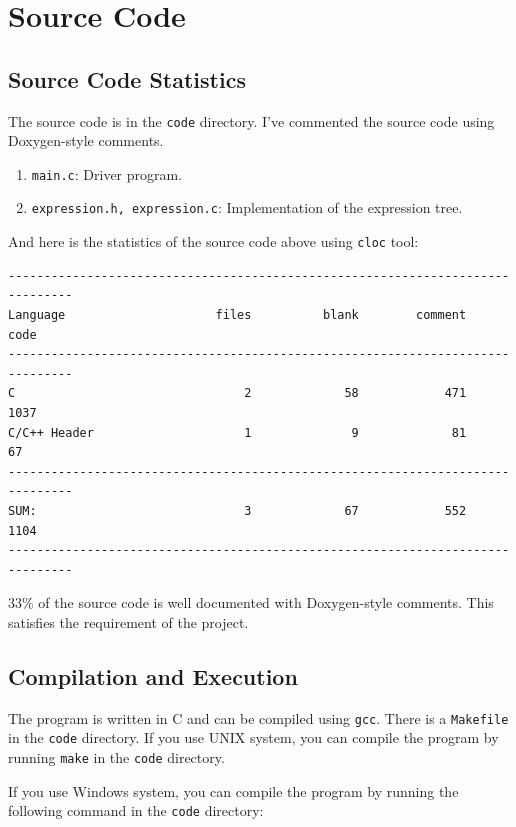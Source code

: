 \documentclass[a4paper,oneside]{book}
\begin{document}
\appendix

\chapter{Source Code}

\section{Source Code Statistics}

The source code is in the \verb|code| directory. I've commented the source code
using Doxygen-style comments.

\begin{enumerate}
    \item \verb|main.c|: Driver program.
    \item \verb|expression.h, expression.c|: Implementation of the expression tree.
\end{enumerate}

And here is the statistics of the source code above using \verb|cloc| tool:

\begin{verbatim}
-------------------------------------------------------------------------------
Language                     files          blank        comment           code
-------------------------------------------------------------------------------
C                                2             58            471           1037
C/C++ Header                     1              9             81             67
-------------------------------------------------------------------------------
SUM:                             3             67            552           1104
-------------------------------------------------------------------------------
\end{verbatim}

$33\%$ of the source code is well documented with Doxygen-style comments. This
satisfies the requirement of the project.

\section{Compilation and Execution}

The program is written in C and can be compiled using \verb|gcc|. There is a \verb|Makefile| in the \verb|code| directory. If you use UNIX system, you can compile the program by running \verb|make| in the \verb|code| directory.

If you use Windows system, you can compile the program by running the following command in the \verb|code| directory:
\end{document}
